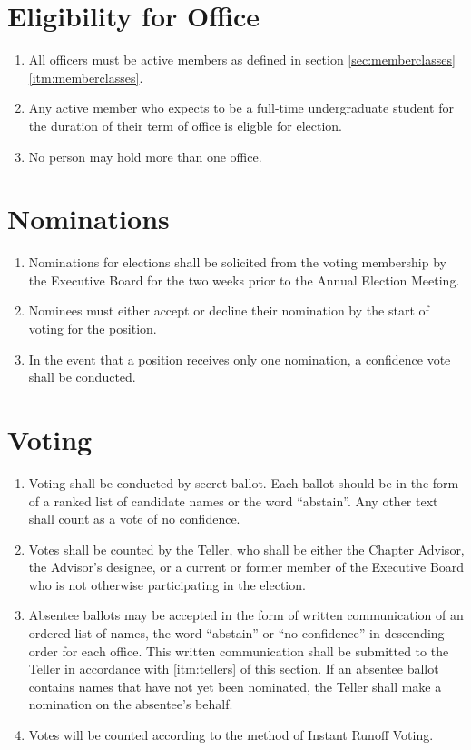 \documentclass[12pt, letterpaper, oneside]{book}
\begin{document}
\section{Eligibility for Office}
\begin{enumerate}
    \item All officers must be active members as defined in
        section \cref{sec:memberclasses} \cref{itm:memberclasses}.
    \item Any active member who expects to be a full-time undergraduate student
        for the duration of their term of office is eligble for election.
    \item No person may hold more than one office.
\end{enumerate}
\section{Nominations}
\begin{enumerate}
    \item Nominations for elections shall be solicited from the voting
        membership by the Executive Board for the two weeks prior to the Annual
        Election Meeting. 
    \item Nominees must either accept or decline their nomination by the start
        of voting for the position.
    \item In the event that a position receives only one nomination, a
        confidence vote shall be conducted.
\end{enumerate}

\section{Voting} \label{sec:voting}
\begin{enumerate}
    \item Voting shall be conducted by secret ballot. Each ballot should be in
        the form of a ranked list of candidate names or the word ``abstain''.
        Any other text shall count as a vote of no confidence.
    \item \label{itm:tellers} Votes shall be counted by the Teller, who shall be
        either the Chapter Advisor, the Advisor's designee, or a current or
        former member of the Executive Board who is not otherwise participating
        in the election.
    \item Absentee ballots may be accepted in the form of written communication
        of an ordered list of names, the word ``abstain'' or ``no confidence''
        in descending order for each office. This written communication shall be
        submitted to the Teller in accordance with \cref{itm:tellers} of this
        section.
        \subitem If an absentee ballot contains names that have not yet been
        nominated, the Teller shall make a nomination on the absentee's behalf.
    \item Votes will be counted according to the method of Instant Runoff Voting.
\end{enumerate}
\end{document}
